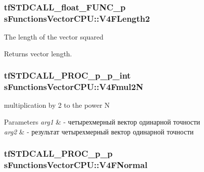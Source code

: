 \hypertarget{structs_functions_vector_c_p_u_a0f63d9b16b384ba993cfb3ba0dbb16cb}{
\subsubsection[{V4\-F\-Length2}]{\setlength{\rightskip}{0pt plus 5cm}tf\-S\-T\-D\-C\-A\-L\-L\-\_\-float\-\_\-\-F\-U\-N\-C\-\_\-p s\-Functions\-Vector\-C\-P\-U\-::\-V4\-F\-Length2}}\label{structs_functions_vector_c_p_u_a0f63d9b16b384ba993cfb3ba0dbb16cb}
The length of the vector squared \begin{DoxyReturn}{Returns}
vector length. 
\end{DoxyReturn}
\hypertarget{structs_functions_vector_c_p_u_ab4510ddff8a8787367682b61b40a9f48}{
\subsubsection[{V4\-Fmul2\-N}]{\setlength{\rightskip}{0pt plus 5cm}tf\-S\-T\-D\-C\-A\-L\-L\-\_\-\-P\-R\-O\-C\-\_\-p\-\_\-p\-\_\-int s\-Functions\-Vector\-C\-P\-U\-::\-V4\-Fmul2\-N}}\label{structs_functions_vector_c_p_u_ab4510ddff8a8787367682b61b40a9f48}
multiplication by 2 to the power N 
\begin{DoxyParams}{Parameters}
{\em arg1} & -\/ четырехмерный вектор одинарной точности \\
\hline
{\em arg2} & -\/ результат четырехмерный вектор одинарной точности \\
\hline
\end{DoxyParams}
\hypertarget{structs_functions_vector_c_p_u_a4454814154f2fb9bb2f339907798d082}{
\subsubsection[{V4\-F\-Normal}]{\setlength{\rightskip}{0pt plus 5cm}tf\-S\-T\-D\-C\-A\-L\-L\-\_\-\-P\-R\-O\-C\-\_\-p\-\_\-p s\-Functions\-Vector\-C\-P\-U\-::\-V4\-F\-Normal}}\label{structs_functions_vector_c_p_u_a4454814154f2fb9bb2f339907798d082}
